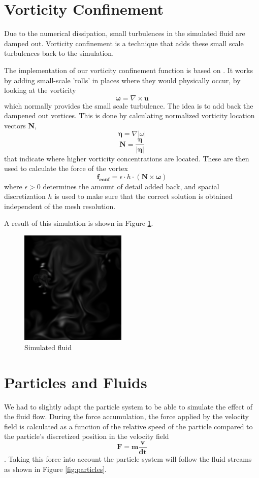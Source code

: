 \documentclass[a4paper,twoside,11pt,twocolumn]{article}
\begin{document}
\section{Vorticity Confinement}
Due to the numerical dissipation, small turbulences in the simulated fluid are damped out. Vorticity confinement is a technique that adds these small scale turbulences back to the simulation.
 
The implementation of our vorticity confinement function is based on \cite{fedkiw}. It works by adding small-scale 'rolls' in places where they would physically occur, by looking at the vorticity \[ \mathbf{\omega} = \nabla \times \mathbf{u} \] which normally provides the small scale turbulence. The idea is to add back the dampened out vortices. This is done by calculating normalized vorticity location vectors \textbf{N},  \[\mathbf{\eta} = \nabla|\omega| \]\[ \mathbf{N} = \frac{\mathbf{\eta}}{|\mathbf{\eta}|} \] that indicate where higher vorticity concentrations are located. These are then used to calculate the force of the vortex \[ \mathbf{f_{conf}} = \epsilon\cdot h\cdot(\mathbf{N} \times \mathbf{\omega}) \] where $\epsilon > 0$ determines the amount of detail added back, and spacial discretization $h$ is used to make sure that the correct solution is obtained independent of the mesh resolution.

A result of this simulation is shown in Figure \ref{fig:fluid}.

\begin{figure}[H]
	\centering
	\includegraphics[width=0.45\textwidth]{Fluid}
	\caption{Simulated fluid}
	\label{fig:fluid}
\end{figure}

\section{Particles and Fluids}
We had to slightly adapt the particle system to be able to simulate the effect of the fluid flow. During the force accumulation, the force applied by the velocity field is calculated as a function of the relative speed of the particle compared to the particle's discretized position in the velocity field \[ \mathbf{F} = \mathbf{m\frac{v}{dt}} \]. Taking this force into account the particle system will follow the fluid streams as shown in Figure \ref{fig:particles}.
\end{document}
